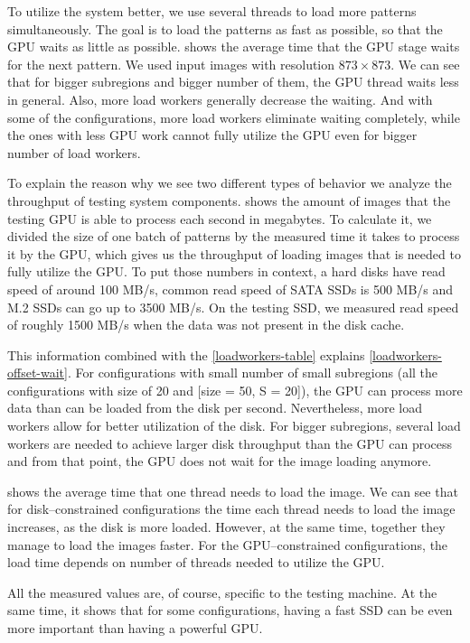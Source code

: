 To utilize the system better, we use several threads to load more patterns simultaneously. The goal is to load the patterns as fast as possible, so that the GPU waits as little as possible.  shows the average time that the GPU stage waits for the next pattern. We used input images with resolution $873\times873$. We can see that for bigger subregions and bigger number of them, the GPU thread waits less in general. Also, more load workers generally decrease the waiting. And with some of the configurations, more load workers eliminate waiting completely, while the ones with less GPU work cannot fully utilize the GPU even for bigger number of load workers.

To explain the reason why we see two different types of behavior we analyze the throughput of testing system components.  shows the amount of images that the testing GPU is able to process each second in megabytes. To calculate it, we divided the size of one batch of patterns by the measured time it takes to process it by the GPU, which gives us the throughput of loading images that is needed to fully utilize the GPU. To put those numbers in context, a hard disks have read speed of around 100 MB/s, common read speed of SATA SSDs is 500 MB/s and M.2 SSDs can go up to 3500 MB/s. On the testing SSD, we measured read speed of roughly 1500 MB/s when the data was not present in the disk cache.

This information combined with the \cref{loadworkers-table} explains \cref{loadworkers-offset-wait}. For configurations with small number of small subregions (all the configurations with size of 20 and [size = 50, S = 20]), the GPU can process more data than can be loaded from the disk per second. Nevertheless, more load workers allow for better utilization of the disk. For bigger subregions, several load workers are needed to achieve larger disk throughput than the GPU can process and from that point, the GPU does not wait for the image loading anymore.

 shows the average time that one thread needs to load the image. We can see that for disk--constrained configurations the time each thread needs to load the image increases, as the disk is more loaded. However, at the same time, together they manage to load the images faster. For the GPU--constrained configurations, the load time depends on number of threads needed to utilize the GPU.

All the measured values are, of course, specific to the testing machine. At the same time, it shows that for some configurations, having a fast SSD can be even more important than having a powerful GPU.

